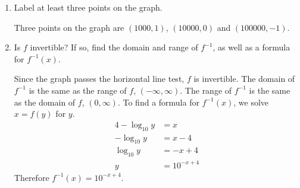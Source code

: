 \documentclass{article}
\begin{document}
\begin{enumerate}[resume]
\begin{enumerate}
  \item
    \begin{problem}[0.25in]
      Label at least three points on the graph.
    \end{problem}

    \begin{solution}
      Three points on the graph are $(1000, 1)$, $(10000,0)$ and
      $(100000,-1)$.
    \end{solution}

  \item
    \begin{problem}[\vfill]
      Is $f$ invertible? If so, find the domain and range of $f^{-1}$, as well as a formula for $f^{-1}(x)$. 
    \end{problem}

    \begin{solution}
      Since the graph passes the horizontal line test, $f$ is invertible.
      The domain of $f^{-1}$ is the same as the range of $f$, 
      $(-\infty, \infty)$. The range of $f^{-1}$ is the same as the 
      domain of $f$, $(0, \infty)$. To find a formula for $f^{-1}(x)$,
      we solve $x=f(y)$ for $y$.
      \begin{align*}
        4-\log_{10} y &= x \\
        -\log_{10} y &= x-4 \\
        \log_{10} y &= -x+4 \\
        y &= 10^{-x+4}
      \end{align*}
      Therefore $f^{-1}(x) = 10^{-x+4}$.
    \end{solution}
  \end{enumerate}

\end{enumerate}
\end{document}
